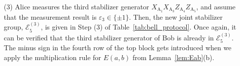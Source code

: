 \documentclass[journal,onecolumn]{IEEEtran}
\begin{document}
\begin{enumerate}
\item[(3)] Alice measures the third stabilizer generator $X_{\text{A}_1} X_{\text{A}_3} Z_{\text{A}_4} Z_{\text{A}_5}$, and %
assume that the measurement result is $\varepsilon_3 \in \{ \pm 1 \}$. %
Then, the new joint stabilizer group, $\mathcal{E}_5^{(3)}$, is given in Step (3) of Table~\ref{tab:bell_protocol}.
Once again, it can be verified that the third stabilizer generator of Bob is already in $\mathcal{E}_5^{(3)}$.
The minus sign in the fourth row of the top block gets introduced when we apply the multiplication rule for $E(a,b)$ from Lemma~\ref{lem:Eab}(b). \\



\end{enumerate}
\end{document}
